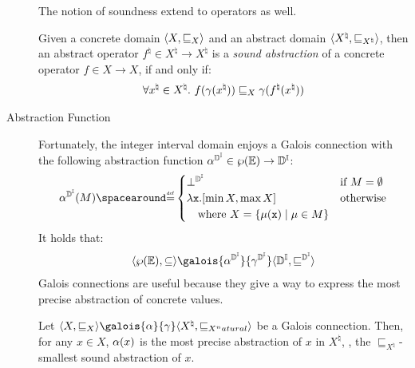 \begin{description}
    The notion of soundness extend to operators as well.
    \begin{definition}
      Given a concrete domain $\langle X, \sqsubseteq_X \rangle$ and an abstract domain $\langle X^\natural, \sqsubseteq_{X^\natural} \rangle$, then an abstract operator $f^\natural\in X^\natural \to X^\natural$ is a \emph{sound abstraction} of a concrete operator $f\in X \to X$, if and only if:
    \begin{align*}
      \forall x^\natural \in X^\natural.~ f(\gamma(x^\natural)) \sqsubseteq_X \gamma(f^\natural(x^\natural))
    \end{align*}
    \end{definition}
    \item[Abstraction Function]
    Fortunately, the integer interval domain enjoys a Galois connection with the following abstraction function $\alpha^{\mathbb{D}^{\mathbb{I}}}\in\wp(\mathbb{E})\to\mathbb{D}^{\mathbb{I}}$:
    \begin{align*}
      \intervalabstractdomainabstraction(\defsetofenvs) \DefeQ \begin{cases}
        \intervalabstractdomainbottom & \text{if } \defsetofenvs = \emptyset \\
        \lambda \defvariable.\interval{\min X}{\max X} & \text{otherwise} \\
        \quad \text{where } X = \setdef{\defenv(\defvariable)}{\defenv\in\defsetofenvs}
      \end{cases}
    \end{align*}
    It holds that:
  \begin{align*}
    \tuple{\setof{\env}}{\subseteq} \galois{\intervalabstractdomainabstraction}{\intervalabstractdomainconcretization}\tuple{\intervalabstractdomaintype}{\intervalabstractdomainsubseteq}
  \end{align*}
  Galois connections are useful because they give a way to express the most precise abstraction of concrete values.
  \begin{remark}
    Let $\tuple{X}{\sqsubseteq_X} \galois{\abstraction}{\concretization}\tuple{X^\natural}{\sqsubseteq_{X^
    natural}}$ be a Galois connection. Then, for any $x \in X$, $\alpha(x)$ is the most precise abstraction of $x$ in $X^\natural$, \ie, the $\sqsubseteq_{X^\natural}$-smallest sound abstraction of $x$.

\end{remark}
\end{description}
